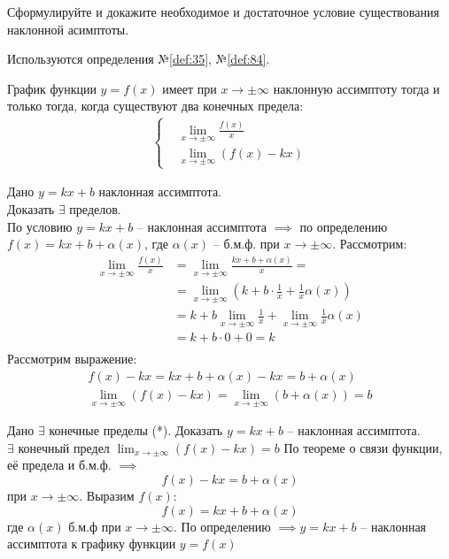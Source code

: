 \begin{question}
    Сформулируйте и докажите необходимое и достаточное условие существования наклонной асимптоты.
\end{question}
\begin{used}
    Используются определения №\ref{def:35}, №\ref{def:84}.
\end{used}
\begin{theorem}
    График функции $y = f(x)$ имеет при  $x \to \pm\infty$ наклонную ассимптоту тогда и только тогда, когда существуют два конечных предела:
    \begin{align*}
        \begin{cases}
            &\lim_{x \to \pm\infty} \frac{f(x)}{x} \\
            &\lim_{x \to \pm\infty} (f(x) - kx)
        \end{cases} \tag{*} 
    \end{align*}
\end{theorem}
\begin{necessity}
    Дано $y = kx + b$ наклонная ассимптота. \\
    Доказать  $\exists $ пределов.\\
    По условию $y = kx + b$ -- наклонная ассимптота  $\implies $ по определению $f(x) = kx + b + \alpha(x)$, где $\alpha(x)$ -- б.м.ф. при $x \to  \pm \infty$.
    Рассмотрим:
    \begin{align*}
        \lim_{x \to \pm\infty} \frac{f(x)}{x} &= \lim_{x \to \pm\infty} \frac{kx + b + \alpha(x)}{x} = \\
            &= \lim_{x \to \pm\infty} (k + b \cdot \frac{1}{x} + \frac{1}{x} \alpha(x)) \\
            &= k + b \lim_{x \to \pm\infty} \frac{1}{x} + \lim_{x \to \pm\infty}\frac{1}{x} \alpha(x) \\
            &= k + b\cdot 0 + 0 = k \\
    \end{align*}
    Рассмотрим выражение:
    \begin{align*}
        f(x) - kx = kx + b + \alpha(x) - kx = b + \alpha(x) \\
        \lim_{x \to \pm\infty} (f(x) - kx) = \lim_{x \to \pm\infty} (b + \alpha(x)) = b 
    \end{align*}
\end{necessity}
\begin{sufficiency}
    Дано $\exists $ конечные пределы (*). Доказать $y = kx + b$ -- наклонная ассимптота. \\
    $\exists $ конечный предел $\lim_{x \to \pm\infty} (f(x) - kx) = b$
    По теореме о связи функции, её предела и б.м.ф. $\implies$ \[
        f(x) - kx = b + \alpha(x)
    \]  при $x \to \pm\infty$. Выразим $f(x)$:  \[
        f(x) = kx + b + \alpha(x)
    \] где $\alpha(x)$ б.м.ф при $x \to \pm\infty$.
    По определению $\implies y = kx + b$ -- наклонная ассимптота к графику функции $y = f(x)$
\end{sufficiency}
\pagebreak



